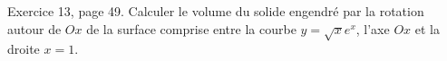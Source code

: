 \begin{exercice}\label{exo0025}

Exercice 13, page 49. Calculer le volume du solide engendré par la rotation autour de $Ox$ de la surface comprise entre la courbe $y=\sqrt{x} e^{x}$, l'axe $Ox$ et la droite $x=1$.

\end{exercice}
